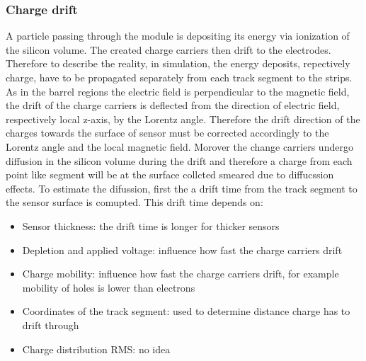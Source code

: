
\subsubsection{Charge drift}

A particle passing through the module is depositing its energy via ionization of the silicon volume. The created charge carriers then drift to the electrodes. Therefore to describe the reality, in simulation, the energy deposits, repectively charge, have to be propagated separately from each track segment to the strips. As in the barrel regions the electric field is perpendicular to the magnetic field, the drift of the charge carriers is deflected from the direction of electric field, respectively local z-axis, by the Lorentz angle. Therefore the drift direction of the charges towards the surface of sensor must be corrected accordingly to the Lorentz angle and the local magnetic field. Morover the change carriers undergo diffusion in the silicon volume during the drift and therefore a charge from each point like segment will be at the surface collcted smeared due to diffucssion effects. To estimate the difussion, first the a drift time from the track segment to the sensor surface is comupted. This drift time depends on:

\begin{itemize}
\item Sensor thickness: the drift time is longer for thicker sensors
\item Depletion and applied voltage: influence how fast the charge carriers drift
\item Charge mobility: influence how fast the charge carriers drift, for example mobility of holes is lower than electrons
\item Coordinates of the track segment: used to determine distance charge has to drift through
\item Charge distribution RMS: no idea %
\end{itemize}

